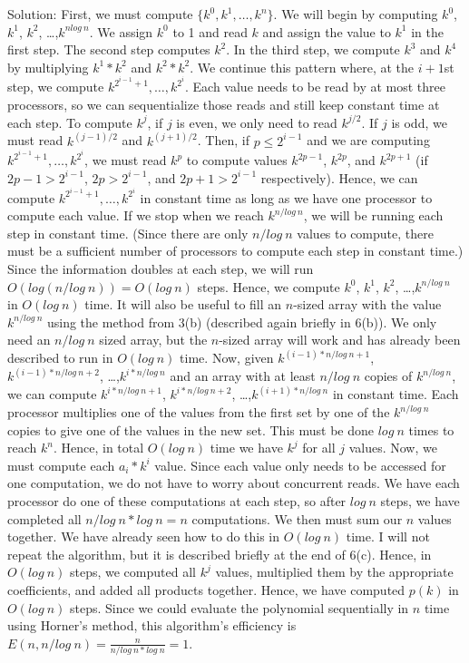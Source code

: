 \documentclass{article}
\begin{document}
\begin{enumerate}
\newline Solution: First, we must compute $\{k^0,k^1,\ldots ,k^n\}$. We will begin by computing $k^0$, $k^1$, $k^2$, \ldots ,$k^{nlog\ n}$. We assign $k^0$ to 1 and read $k$ and assign the value to $k^1$ in the first step. The second step computes $k^2$. In the third step, we compute $k^3$ and $k^4$ by multiplying $k^1*k^2$ and $k^2*k^2$. We continue this pattern where, at the $i+1$st step, we compute $k^{2^{i-1}+1},\ldots ,k^{2^i}$. Each value needs to be read by at most three processors, so we can sequentialize those reads and still keep constant time at each step. To compute $k^j$, if $j$ is even, we only need to read $k^{j/2}$. If $j$ is odd, we must read $k^{(j-1)/2}$ and $k^{(j+1)/2}$. Then, if $p\le 2^{i-1}$ and we are computing $k^{2^{i-1}+1},\ldots ,k^{2^i}$, we must read $k^p$ to compute values $k^{2p-1}$, $k^{2p}$, and $k^{2p+1}$ (if $2p-1> 2^{i-1}$, $2p>2^{ i-1}$, and $2p+1> 2^{i-1}$ respectively). Hence, we can compute $k^{2^{i-1}+1},\ldots ,k^{2^i}$ in constant time as long as we have one processor to compute each value. If we stop when we reach $k^{n/log\ n}$, we will be running each step in constant time. (Since there are only $n/log\ n$ values to compute, there must be a sufficient number of processors to compute each step in constant time.) Since the information doubles at each step, we will run $O(log(n/log\ n))=O(log\ n)$ steps. Hence, we compute $k^0$, $k^1$, $k^2$, \ldots ,$k^{n/log\ n}$ in $O(log\ n)$ time.  It will also be useful to fill an $n$-sized array with the value $k^{n/log\ n}$ using the method from 3(b) (described again briefly in 6(b)). We only need an $n/log\ n$ sized array, but the $n$-sized array will work and has already been described to run in $O(log\ n)$ time.
\newline
\newline Now, given $k^{(i-1)*n/log\ n+1}$, $k^{(i-1)*n/log\ n+2}$, \ldots ,$k^{i*n/log\ n}$ and an array with at least $n/log\ n$ copies of $k^{n/log\ n}$, we can compute $k^{i*n/log\ n+1}$, $k^{i*n/log\ n+2}$, \ldots ,$k^{(i+1)*n/log\ n}$ in constant time. Each processor multiplies one of the values from the first set by one of the $k^{n/log\ n}$ copies to give one of the values in the new set. This must be done $log\ n$ times to reach $k^n$. Hence, in total $O(log\ n)$ time we have $k^j$ for all $j$ values.
\newline
\newline Now, we must compute each $a_i*k^i$ value. Since each value only needs to be accessed for one computation, we do not have to worry about concurrent reads. We have each processor do one of these computations at each step, so after $log\ n$ steps, we have completed all $n/log\ n*log\ n=n$ computations. We then must sum our $n$ values together. We have already seen how to do this in $O(log\ n)$ time. I will not repeat the algorithm, but it is described briefly at the end of 6(c). Hence, in $O(log\ n)$ steps, we computed all $k^j$ values, multiplied them by the appropriate coefficients, and added all products together. Hence, we have computed $p(k)$ in $O(log\ n)$ steps. Since we could evaluate the polynomial sequentially in $n$ time using Horner's method, this algorithm's efficiency is $E(n,n/log\ n)=\frac{n}{n/log\ n*log\ n}=1$.

\end{enumerate}
\end{document}
